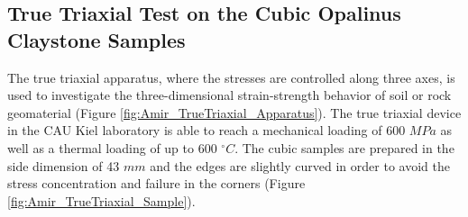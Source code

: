 \subsection{True Triaxial Test on the Cubic Opalinus Claystone Samples}
\label{sec:True_Triaxial_Exp}

The true triaxial apparatus, where the stresses are controlled along three axes, is used to investigate the three-dimensional strain-strength behavior of soil or rock geomaterial (Figure \ref{fig:Amir_TrueTriaxial_Apparatus}). The true triaxial device in the CAU Kiel laboratory is able to reach a mechanical loading of 600 $MPa$ as well as a thermal loading of up to 600 $^{\circ}C$. The cubic samples are prepared in the side dimension of 43 $mm$ and the edges are slightly curved in order to avoid the stress concentration and failure in the corners (Figure \ref{fig:Amir_TrueTriaxial_Sample}).

